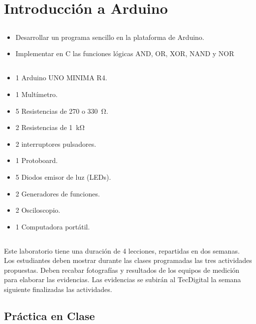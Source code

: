 \graphicspath{{../assets/01_introduction_to_arduino/}}
\chapter{Introducción a Arduino}
\section{\obj}
\capacidad
\begin{itemize}
    \item Desarrollar un programa sencillo en la plataforma de Arduino.
    \item Implementar en C las funciones lógicas AND, OR, XOR, NAND y NOR
\end{itemize}

\section{\mat}
\begin{itemize}
    \item 1 Arduino UNO MINIMA R4.
    \item 1 Multímetro.
    \item 5 Resistencias de 270 o \SI{330}{\ohm}.
    \item 2 Resistencias de \SI{1}{\kilo\ohm}
    \item 2 interruptores pulsadores.
    \item 1 Protoboard.
    \item 5 Diodos emisor de luz (LEDs).
    \item 2 Generadores de funciones.
    \item 2 Osciloscopio.
    \item 1 Computadora portátil.
\end{itemize}

\section{\pro}

Este laboratorio tiene una duración de 4 lecciones, repartidas en dos semanas. Los estudiantes deben mostrar durante las clases programadas las tres actividades propuestas. Deben recabar fotografías y resultados de los equipos de medición para elaborar las evidencias. Las evidencias se subirán al TecDigital la semana siguiente finalizadas las actividades.

\section{Práctica en Clase}

